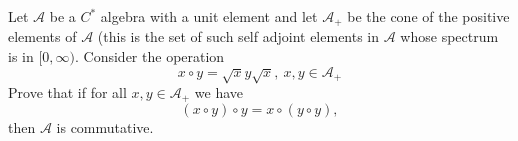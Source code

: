 Let ${\mathcal A}$ be a ${C^{\ast}}$ algebra with a unit element and let ${\mathcal A_+}$ be the cone of the positive elements of ${\mathcal A}$ (this is the set of such self adjoint elements in ${\mathcal A}$ whose spectrum is in ${[0,\infty)}$. Consider the operation
\[ \displaystyle x \circ y =\sqrt{x}y\sqrt{x},\ x,y \in \mathcal A_+\]
Prove that if for all ${x,y \in \mathcal A_+}$ we have
\[ \displaystyle (x\circ y)\circ y = x \circ (y \circ y), \]
then ${\mathcal A}$ is commutative.

